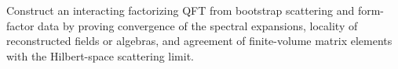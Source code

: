 \begin{openproblem}
\label{op:form-factor-construction}
Construct an interacting factorizing QFT from bootstrap scattering and
form-factor data by proving convergence of the spectral expansions, locality
of reconstructed fields or algebras, and agreement of finite-volume matrix
elements with the Hilbert-space scattering limit.
\end{openproblem}

